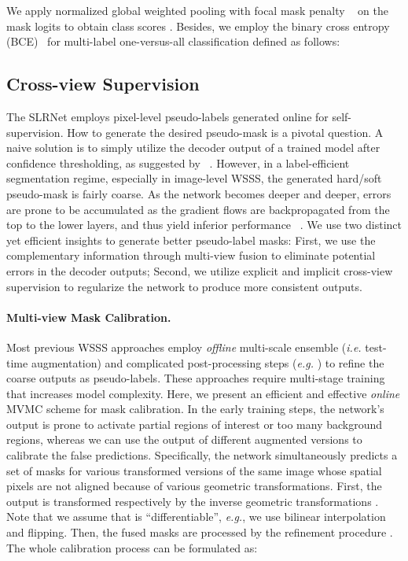\documentclass[twocolumn]{svjour3}          \smartqed  \usepackage{graphicx}
\begin{document}
We apply normalized global weighted pooling with focal mask penalty ~\citep{Araslanov020:SingleStage} on the mask logits  to obtain class scores .
Besides, we employ the binary cross entropy (BCE)~\citep{paszke2017:pytorch} for multi-label one-versus-all classification defined as follows:


\subsection{Cross-view Supervision}
\label{sec:cv_sup}
The SLRNet employs pixel-level pseudo-labels generated online for self-supervision.
How to generate the desired pseudo-mask  is a pivotal question.
A naive solution is to simply utilize the decoder output of a trained model after confidence thresholding, as suggested by ~\cite{ZophGLCLC020:RethinkingPreTraining,SohnBCZZRCKL20:FixMatch}.
However, in a label-efficient segmentation regime, especially in image-level WSSS, the generated hard/soft pseudo-mask is fairly coarse.
As the network becomes deeper and deeper, errors are prone to be accumulated as the gradient flows are backpropagated from the top to the lower layers, and thus yield inferior performance ~\citep{deeplabv3plus2018,Araslanov020:SingleStage}.
We use two distinct yet efficient insights to generate better pseudo-label masks: First, we use the complementary information through multi-view fusion to eliminate potential errors in the decoder outputs; Second, we utilize  explicit and implicit cross-view supervision to regularize the network to produce more consistent outputs.

\paragraph{Multi-view Mask Calibration.}
Most previous WSSS approaches employ \textit{offline} multi-scale ensemble (\textit{i.e.} test-time augmentation) and complicated post-processing steps (\textit{e.g.} \cite{AhnK18:PSA,AhnCK19:IRN,dong_2020:conta}) to refine the coarse outputs as pseudo-labels. 
These approaches require multi-stage training that increases model complexity.
Here, we present an efficient and effective \textit{online} MVMC scheme for mask calibration.
In the early training steps, the network's output is prone to activate partial regions of interest or too many background regions, whereas we can use the output of different augmented versions to calibrate the false predictions.
Specifically, the network simultaneously predicts a set of masks  for various transformed versions of the same image whose spatial pixels are not aligned because of various geometric transformations.
First, the output  is transformed respectively by the inverse geometric transformations . Note that we assume that  is ``differentiable'', \textit{e.g.}, we use bilinear interpolation and flipping. Then, the fused masks are processed by the refinement procedure .
The whole calibration process can be formulated as:
\end{document}
